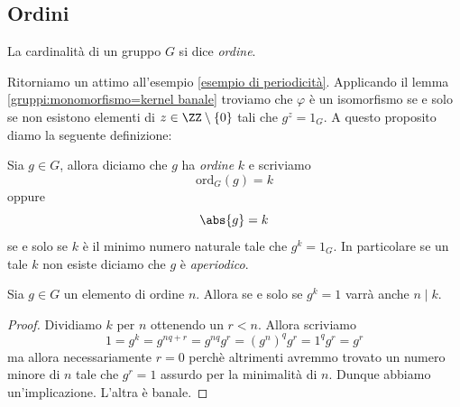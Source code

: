\documentclass[11pt]{scrartcl}
\newcommand{\ordine}[2]{\text{ord}_{#1}\left(#2\right)}
\begin{document}
	\subsection{Ordini}
	
	\begin{definition}
		La cardinalità di un gruppo $G$ si dice \textit{ordine}.
	\end{definition}
	
	Ritorniamo un attimo all'esempio \ref{esempio di periodicità}. Applicando il lemma \ref{gruppi:monomorfismo=kernel banale} troviamo che $\varphi$ è un isomorfismo se e solo se non esistono elementi di $z\in\ZZ\setminus\left\{0\right\}$ tali che $g^z=1_G$. A questo proposito diamo la seguente definizione:
	\begin{definition}
		Sia $g\in G$, allora diciamo che $g$ ha \textit{ordine} $k$ e scriviamo 
		$$\ordine{G}{g}=k$$
		oppure
		$$\abs{g}=k$$
		se e solo se $k$ è il minimo numero naturale tale che $g^k=1_G$. In particolare se un tale $k$ non esiste diciamo che $g$ è \textit{aperiodico}. 
	\end{definition} 
	\begin{lemma}\label{gruppi:ordine divide tutte le potenze che danno l'identità}
		Sia $g\in G$ un elemento di ordine $n$. Allora se e solo se $g^k=1$ varrà anche $n\mid k$.
	\end{lemma}
	\begin{proof}
		Dividiamo $k$ per $n$ ottenendo un $r<n$. Allora scriviamo
		$$1=g^{k}=g^{nq+r}=g^{nq}g^r=(g^n)^qg^r=1^qg^r=g^r$$
		ma allora necessariamente $r=0$ perchè altrimenti avremmo trovato un numero minore di $n$ tale che $g^r=1$ assurdo per la minimalità di $n$. Dunque abbiamo un'implicazione. L'altra è banale.
	\end{proof}
	
\end{document}
